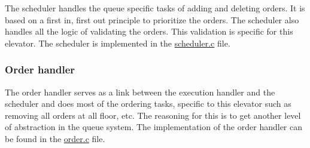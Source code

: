 The scheduler handles the queue specific tasks of adding and deleting orders. It is based on a first in, first out principle to prioritize the orders. The scheduler also handles all the logic of validating the orders. This validation is specific for this elevator. The scheduler is implemented in the \hyperlink{scheduler_8c_source}{scheduler.\+c} file.\hypertarget{index_order}{}\subsubsection{Order handler}\label{index_order}
The order handler serves as a link between the execution handler and the scheduler and does most of the ordering tasks, specific to this elevator such as removing all orders at all floor, etc. The reasoning for this is to get another level of abstraction in the queue system. The implementation of the order handler can be found in the \hyperlink{order_8c_source}{order.\+c} file. 